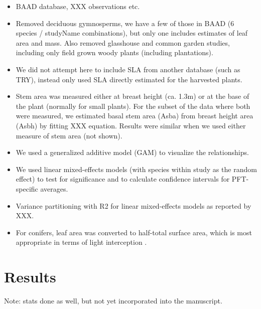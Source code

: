 \documentclass[a4paper]{article}
\begin{document}
\begin{itemize}
\item BAAD database, XXX observations etc.

\item Removed deciduous gymnosperms, we have a few of those in BAAD (6 species / studyName combinations), but only one includes estimates of leaf area and mass. Also removed glasshouse and common garden studies, including only field grown woody plants (including plantations).

\item We did not attempt here to include SLA from another database (such as TRY), instead only used SLA directly estimated for the harvested plants.

\item Stem area was measured either at breast height (ca. 1.3m) or at the base of the plant (normally for small plants). For the subset of the data where both were measured, we estimated basal stem area (Asba) from breast height area (Asbh) by fitting XXX equation. Results were similar when we used either measure of stem area (not shown).

\item We used a generalized additive model (GAM) to visualize the relationships. 

\item We used linear mixed-effects models (with species within study as the random effect) to test for significance and to calculate confidence intervals for  PFT-specific averages.

\item Variance partitioning with R2 for linear mixed-effects models as reported by XXX.

\item For conifers, leaf area was converted to half-total surface area, which is most appropriate in terms of light interception  \cite{lang_application_1991, chen_defining_1992}.
\end{itemize}




\section{Results}

Note: stats done as well, but not yet incorporated into the manuscript.
\end{document}
